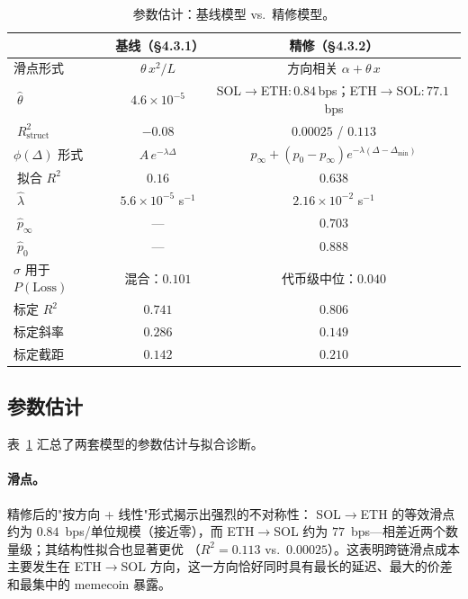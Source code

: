 \documentclass[11pt,a4paper]{ctexart}
\newcommand{\SolEth}{SOL$\to$ETH}
\newcommand{\EthSol}{ETH$\to$SOL}
\begin{document}
\begin{table}[t]
    \centering
    \small
    \caption{参数估计：基线模型 vs.\ 精修模型。}
    \label{tab:ch4-validation}
    \begin{tabular}{lcc}
        \toprule
        & 基线（§4.3.1） & 精修（§4.3.2） \\
        \midrule
        滑点形式 & $\theta\,x^{2}/L$ & 方向相关 $\alpha + \theta\,x$ \\
        $\;\hat\theta$ & $4.6\!\times\!10^{-5}$ & \SolEth:\,$0.84$\,bps；\EthSol:\,$77.1$\,bps \\
        $\;R^{2}_{\text{struct}}$ & $-0.08$ & $0.00025$ / $0.113$ \\
        \addlinespace
        $\phi(\Delta)$ 形式 & $A\,e^{-\lambda\Delta}$ & $p_{\infty}+(p_{0}-p_{\infty})e^{-\lambda(\Delta-\Delta_{\min})}$ \\
        $\;$拟合 $R^{2}$ & $0.16$ & $\mathbf{0.638}$ \\
        $\;\hat\lambda$ & $5.6\!\times\!10^{-5}$ s$^{-1}$ & $2.16\!\times\!10^{-2}$ s$^{-1}$ \\
        $\;\hat p_{\infty}$ & --- & $0.703$ \\
        $\;\hat p_{0}$ & --- & $0.888$ \\
        \addlinespace
        $\sigma$ 用于 $P(\text{Loss})$ & 混合：$0.101$ & 代币级中位：$0.040$ \\
        标定 $R^{2}$ & $0.741$ & $\mathbf{0.806}$ \\
        标定斜率 & $0.286$ & $0.149$ \\
        标定截距 & $0.142$ & $0.210$ \\
        \bottomrule
    \end{tabular}
\end{table}

\subsection{参数估计}

表~\ref{tab:ch4-validation} 汇总了两套模型的参数估计与拟合诊断。

\paragraph{滑点。} 精修后的"按方向 + 线性"形式揭示出强烈的不对称性：
\SolEth{} 的等效滑点约为 $0.84$~bps/单位规模（接近零），而 \EthSol{}
约为 $77$~bps---相差近两个数量级；其结构性拟合也显著更优
（$R^{2}\!=\!0.113$ vs.\ $0.00025$）。这表明跨链滑点成本主要发生在
\EthSol{} 方向，这一方向恰好同时具有最长的延迟、最大的价差和最集中的
memecoin 暴露。
\end{document}
